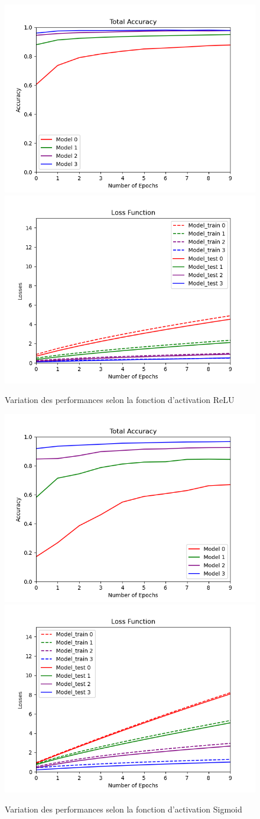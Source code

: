 \documentclass[a4paper]{article}
\begin{document}
		\begin{figure}[!ht]
			\centering
			\includegraphics[width=.5\textwidth]{Fig_p4_relu.png}\hfill
			\includegraphics[width=.5\textwidth]{Fig_p4_losses_relu.png}\hfill
			\caption{Variation des performances selon la fonction d'activation ReLU}	
		\end{figure}
		
		\begin{figure}[!ht]
			\centering
			\includegraphics[width=.5\textwidth]{Fig_p4_acc_sigmoid.png}\hfill
			\includegraphics[width=.5\textwidth]{Fig_p4_losses_sigmoid.png}\hfill
			\caption{Variation des performances selon la fonction d'activation Sigmoid}	
		\end{figure}
		
\end{document}
